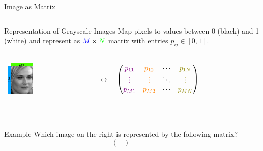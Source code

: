 \documentclass[10pt,aspectratio=169,usenames,dvipsnames,handout]{beamer} %
\begin{document}
\begin{frame}[fragile]{Image as Matrix}
\begin{minipage}{0.48\textwidth}
	\begin{columns}[T,onlytextwidth]
		\column{\textwidth}
		\begin{block}{Representation of Grayscale Images}
			Map pixels to values between 0 (black) and 1 (white)
			and represent as $\textcolor{blue}{M}\times\textcolor{green}{N}$
			matrix with entries $p_{ij}\in\left[0,1\right]$.
		\end{block}
	\end{columns}
\end{minipage}\hfill
\begin{minipage}{0.48\textwidth}
	\vspace{0.5cm}
	\begin{tabular}{m{2cm} m{0.5cm} c}
	\includegraphics[width=0.3\textwidth]{images/vectormatrix/ImageToVector} &
	$\longleftrightarrow$ &
	$\begin{pmatrix}
		\textcolor{violet}{p_{11}} & \textcolor{orange}{p_{12}} & \cdots & \textcolor{olive}{p_{1N}} \\
		\textcolor{violet}{\vdots} & \textcolor{orange}{\vdots} & \ddots & \textcolor{olive}{\vdots} \\
		\textcolor{violet}{p_{M1}} & \textcolor{orange}{p_{M2}} & \cdots &  \textcolor{olive}{p_{MN}} \\
	\end{pmatrix}$
\end{tabular}\\[0.5cm]
\pause
\end{minipage}
\begin{minipage}{0.48\textwidth}
	\begin{columns}[T,onlytextwidth]
	\column{\textwidth}
		\begin{block}{Example}
			Which image on the right is represented by the following matrix?
			\begin{equation*}
				\begin{pmatrix}

\end{pmatrix}
\end{equation*}
\end{block}
\end{columns}
\end{minipage}
\end{frame}
\end{document}
